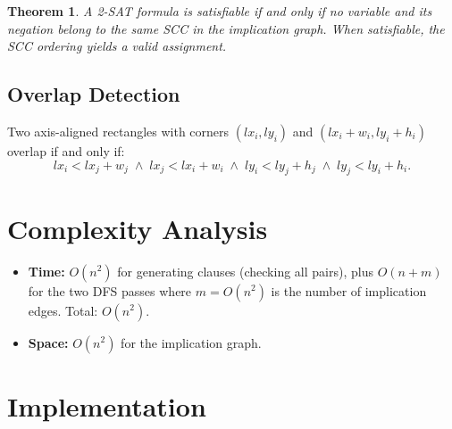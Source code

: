 \documentclass[11pt,a4paper]{article}
\newtheorem{theorem}{Theorem}
\begin{document}
\begin{theorem}
A 2-SAT formula is satisfiable if and only if no variable and its negation
belong to the same SCC in the implication graph. When satisfiable, the SCC
ordering yields a valid assignment.
\end{theorem}

\subsection{Overlap Detection}

Two axis-aligned rectangles with corners $(lx_i, ly_i)$ and
$(lx_i + w_i, ly_i + h_i)$ overlap if and only if:
\[
  lx_i < lx_j + w_j \;\land\; lx_j < lx_i + w_i
  \;\land\; ly_i < ly_j + h_j \;\land\; ly_j < ly_i + h_i.
\]

\section{Complexity Analysis}

\begin{itemize}
  \item \textbf{Time:} $O(n^2)$ for generating clauses (checking all pairs),
    plus $O(n + m)$ for the two DFS passes where $m = O(n^2)$ is the number
    of implication edges. Total: $O(n^2)$.
  \item \textbf{Space:} $O(n^2)$ for the implication graph.
\end{itemize}

\section{Implementation}
\end{document}

